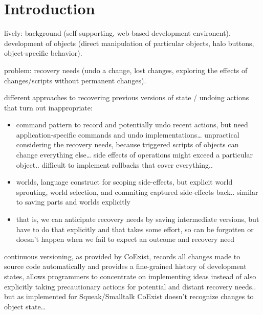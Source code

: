 
\section{Introduction} \label{sec:INTRODUCTION}

lively: background (self-supporting, web-based development environent). development of objects (direct manipulation of particular objects, halo buttons, object-specific behavior).

problem: recovery needs (undo a change, lost changes, exploring the effects of changes/scripts without permanent changes).


different approaches to recovering previous versions of state / undoing actions that turn out inappropriate:
\begin{itemize}
    \item command pattern to record and potentially undo recent actions, but need application-specific commands and undo implementations… unpractical considering the  recovery needs, because triggered scripts of objects can change everything else… side effects of operations might exceed a particular object.. difficult to implement rollbacks that cover everything..
    \item worlds, language construct for scoping side-effects, but explicit world sprouting, world selection, and commiting captured side-effects back.. similar to saving parts and worlds explicitly
    \item that is, we can anticipate recovery needs by saving intermediate versions, but have to do that explicitly and that takes some effort, so can be forgotten or doesn’t happen when we fail to expect an outcome and recovery need
\end{itemize}





continuous versioning, as provided by CoExist, records all changes made to source code automatically and provides a fine-grained history of development states, allows programmers to concentrate on implementing ideas instead of also explicitly taking precautionary actions for potential and distant recovery needs..
but as implemented for Squeak/Smalltalk CoExist doesn’t recognize changes to object state…

